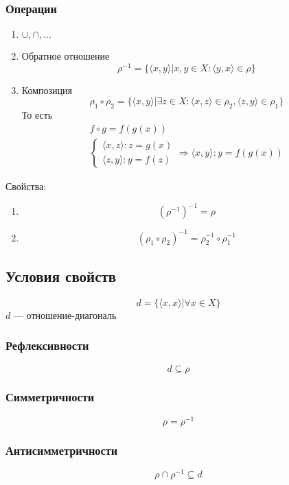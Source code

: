 \documentclass{article}
\begin{document}
\subsubsection{Операции}

\begin{enumerate}
	\item $\cup, \cap, \dots$
	\item Обратное отношение
	\[
		\rho^{-1} = \{ \langle x, y \rangle | x, y \in X : \langle y, x \rangle \in \rho \}
	\]
	\item Композиция
	\[
		\rho_1 \circ \rho_2 = \{ \langle x, y \rangle | \exists z \in X :
		\langle x, z \rangle \in \rho_2, \langle z, y \rangle \in \rho_1 \}
	\]
	То есть
	\begin{gather*}
		f \circ g = f(g(x)) \\
		\begin{cases}
			\langle x, z \rangle: z = g(x) \\
			\langle z, y \rangle: y = f(z)
		\end{cases} \Rightarrow \langle x, y \rangle: y = f(g(x))
	\end{gather*}
\end{enumerate}

Свойства:

\begin{enumerate}
	\item \[ (\rho^{-1})^{-1} = \rho \]
	\item \[ (\rho_1 \circ \rho_2)^{-1} = \rho_2^{-1} \circ \rho_1^{-1} \]
\end{enumerate}

\subsection{Условия свойств}

\[
d = \{ \langle x, x \rangle | \forall x \in X \}
\]
$d$ --- отношение-диагональ

\subsubsection{Рефлексивности}
\[ d \subseteq \rho \]

\subsubsection{Симметричности}
\[ \rho = \rho^{-1} \]

\subsubsection{Антисимметричности}
\[ \rho \cap \rho^{-1} \subseteq d \]
\end{document}
